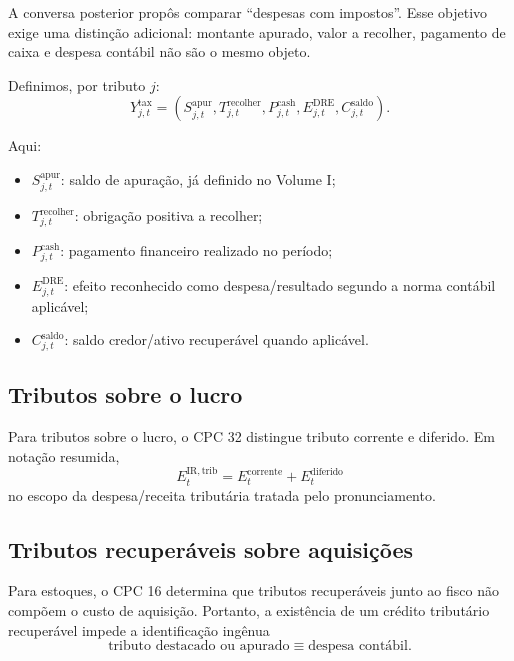 \documentclass[11pt,a4paper]{article}
\begin{document}
A conversa posterior propôs comparar ``despesas com impostos''. Esse objetivo exige uma distinção adicional: montante apurado, valor a recolher, pagamento de caixa e despesa contábil não são o mesmo objeto.

Definimos, por tributo $j$:
\begin{equation}
\boxed{
Y_{j,t}^{\mathrm{tax}}=
\left(
S_{j,t}^{\mathrm{apur}},
T_{j,t}^{\mathrm{recolher}},
P_{j,t}^{\mathrm{cash}},
E_{j,t}^{\mathrm{DRE}},
C_{j,t}^{\mathrm{saldo}}
\right).
}
\label{eq:tax-output}
\end{equation}

Aqui:
\begin{itemize}
  \item $S_{j,t}^{\mathrm{apur}}$: saldo de apuração, já definido no Volume I;
  \item $T_{j,t}^{\mathrm{recolher}}$: obrigação positiva a recolher;
  \item $P_{j,t}^{\mathrm{cash}}$: pagamento financeiro realizado no período;
  \item $E_{j,t}^{\mathrm{DRE}}$: efeito reconhecido como despesa/resultado segundo a norma contábil aplicável;
  \item $C_{j,t}^{\mathrm{saldo}}$: saldo credor/ativo recuperável quando aplicável.
\end{itemize}

\subsection{Tributos sobre o lucro}

Para tributos sobre o lucro, o CPC 32 distingue tributo corrente e diferido. Em notação resumida,
\begin{equation}
\boxed{
E_t^{\mathrm{IR,trib}}
=E_t^{\mathrm{corrente}}+E_t^{\mathrm{diferido}}
}
\end{equation}
no escopo da despesa/receita tributária tratada pelo pronunciamento.

\subsection{Tributos recuperáveis sobre aquisições}

Para estoques, o CPC 16 determina que tributos recuperáveis junto ao fisco não compõem o custo de aquisição. Portanto, a existência de um crédito tributário recuperável impede a identificação ingênua
\[
\text{tributo destacado ou apurado}\equiv\text{despesa contábil}.
\]
\end{document}
